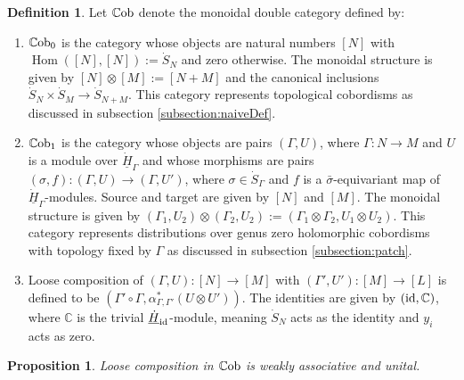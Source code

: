 \documentclass[11pt]{report}
\newtheorem{prop}[theorem]{Proposition}
\theoremstyle{definition}
\newtheorem{definition}[theorem]{Definition}
\theoremstyle{remark}
\theoremstyle{remark}
\newcommand{\Hom}{\operatorname{Hom}}
\newcommand{\id}{\textnormal{id}}
\newcommand{\C}{\mathbb{C}}
\begin{document}
\begin{definition}
Let $\mathbb{C}\textnormal{ob}$ denote the monoidal double category defined by:
\begin{enumerate}[label=(\roman*)]
\item $\mathbb{C}\textnormal{ob}_0$ is the category whose objects are natural numbers $[N]$ with $\Hom([N],[N]) := \dot S_N$ and zero otherwise. The monoidal structure is given by $[N] \otimes [M] := [N+M]$ and the canonical inclusions $\dot S_N \times \dot S_M \to \dot S_{N+M}$. This category represents topological cobordisms as discussed in subsection \ref{subsection:naiveDef}.
\item $\mathbb{C}\textnormal{ob}_1$ is the category whose objects are pairs $(\Gamma,U)$, where $\Gamma: N \to M$ and $U$ is a module over $\underline{\dot H}_\Gamma$ and whose morphisms are pairs $(\sigma,f):(\Gamma,U) \to (\Gamma,U')$, where $\sigma \in \dot S_\Gamma$ and $f$ is a $\bar \sigma$-equivariant map of $\underline{\dot H}_\Gamma$-modules. Source and target are given by $[N]$ and $[M]$. The monoidal structure is given by $(\Gamma_1,U_2) \otimes (\Gamma_2,U_2) := (\Gamma_1 \otimes \Gamma_2, U_1 \otimes U_2)$. This category represents distributions over genus zero holomorphic cobordisms with topology fixed by $\Gamma$ as discussed in subsection \ref{subsection:patch}.
\item Loose composition of $(\Gamma,U): [N] \to [M]$ with $(\Gamma',U'): [M] \to [L]$ is defined to be $(\Gamma' \circ \Gamma, \alpha_{\Gamma,\Gamma'}^*(U \otimes U'))$. The identities are given by $(\id,\C)$, where $\C$ is the trivial $\underline{\dot H}_\id$-module, meaning $\dot S_N$ acts as the identity and $y_i$ acts as zero.
\end{enumerate}
\end{definition}

\begin{prop}
Loose composition in $\mathbb{C}\textnormal{ob}$ is weakly associative and unital.
\end{prop}
\end{document}
